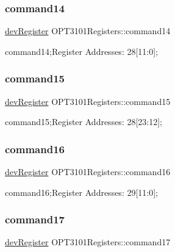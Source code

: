 \subsubsection{\texorpdfstring{command14}{command14}}
{\footnotesize\ttfamily \mbox{\hyperlink{classdev_register}{dev\+Register}} O\+P\+T3101\+Registers\+::command14}



command14;Register Addresses\+: 28\mbox{[}11\+:0\mbox{]}; 

\mbox{\label{class_o_p_t3101_registers_ab271fc67300955f3e8fb05e7380e77ee}} 
\subsubsection{\texorpdfstring{command15}{command15}}
{\footnotesize\ttfamily \mbox{\hyperlink{classdev_register}{dev\+Register}} O\+P\+T3101\+Registers\+::command15}



command15;Register Addresses\+: 28\mbox{[}23\+:12\mbox{]}; 

\mbox{\label{class_o_p_t3101_registers_a0b5bcf7b6eb5131529f3f822883aa8ce}} 
\subsubsection{\texorpdfstring{command16}{command16}}
{\footnotesize\ttfamily \mbox{\hyperlink{classdev_register}{dev\+Register}} O\+P\+T3101\+Registers\+::command16}



command16;Register Addresses\+: 29\mbox{[}11\+:0\mbox{]}; 

\mbox{\label{class_o_p_t3101_registers_aafeb04050df7b1f570f73325902351e2}} 
\subsubsection{\texorpdfstring{command17}{command17}}
{\footnotesize\ttfamily \mbox{\hyperlink{classdev_register}{dev\+Register}} O\+P\+T3101\+Registers\+::command17}



